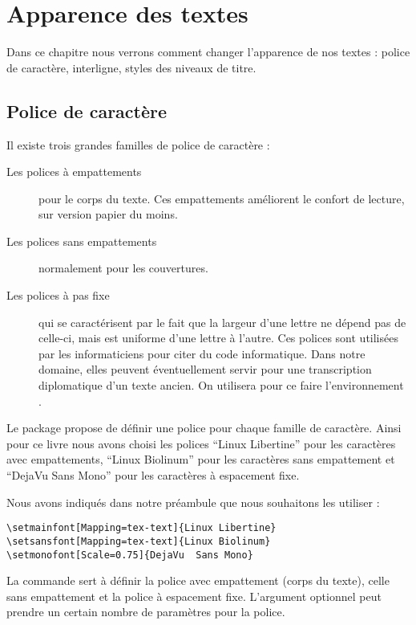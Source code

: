 \chapter{Apparence des textes}


\begin{prealable}
Dans ce chapitre nous verrons comment changer l'apparence de nos textes : police de caractère, interligne, styles des niveaux de titre.  
\end{prealable}

\section{Police de caractère}

Il existe trois grandes familles de police de caractère : 
\begin{description}
\item[Les polices à empattements]pour le corps du texte. Ces empattements améliorent le confort de lecture, sur version papier du moins. 
\item[Les polices sans empattements]normalement pour les couvertures.
\item[Les polices à pas fixe]qui se caractérisent par le fait que la largeur d'une lettre ne dépend pas de celle-ci, mais est uniforme d'une lettre à l'autre. Ces polices sont utilisées par les informaticiens pour citer du code informatique. Dans notre domaine, elles peuvent éventuellement servir pour une transcription diplomatique d'un texte ancien. On utilisera pour ce faire l'environnement .
\end{description}

Le package  propose de définir une police pour chaque famille de caractère. Ainsi pour ce livre nous avons choisi les polices \enquote{Linux Libertine} pour les caractères avec empattements, \enquote{Linux Biolinum} pour les caractères sans empattement et \enquote{DejaVu  Sans Mono} pour les caractères à espacement fixe.

Nous avons indiqués dans notre préambule que nous souhaitons les utiliser :

\begin{verbatim}
\setmainfont[Mapping=tex-text]{Linux Libertine}
\setsansfont[Mapping=tex-text]{Linux Biolinum}
\setmonofont[Scale=0.75]{DejaVu  Sans Mono}
\end{verbatim}

La commande  sert à définir la police avec empattement (corps du texte),  celle sans empattement et  la police à espacement fixe. L'argument optionnel peut prendre un certain nombre de paramètres pour la police. 

